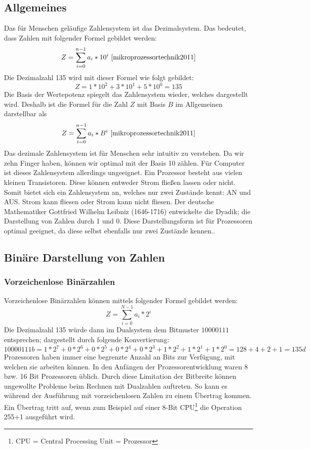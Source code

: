\documentclass[a4paper,12pt]{article}
\begin{document}
\subsection{Allgemeines}
Das für Menschen geläufige Zahlensystem ist das Dezimalsystem. Das bedeutet, dass Zahlen mit folgender Formel gebildet werden:
$$Z=\sum\limits_{i=0}^{n-1} a_i * 10^i \ \cite{mikroprozessortechnik2011}$$
Die Dezimalzahl 135 wird mit dieser Formel wie folgt gebildet:$$Z=1*10^2+3*10^1+5*10^0 = 135$$
Die Basis der Wertepotenz spiegelt das Zahlensystem wieder, welches dargestellt wird. Deshalb ist die Formel für die Zahl $Z$ mit Basis $B$ im Allgemeinen darstellbar als
$$Z=\sum\limits_{i=0}^{n-1} a_i * B^i \ \cite{mikroprozessortechnik2011}$$ 
Das dezimale Zahlensystem ist für Menschen sehr intuitiv zu verstehen. Da wir zehn Finger haben, können wir optimal mit der Basis 10 zählen. Für Computer ist dieses Zahlensystem allerdings ungeeignet. Ein Prozessor besteht aus vielen kleinen Transistoren. Diese können entweder Strom fließen lassen oder nicht. Somit bietet sich ein Zahlensystem an, welches nur zwei Zustände kennt: AN und AUS. Strom kann fliesen oder Strom kann nicht fliesen. Der deutsche Mathematiker Gottfried Wilhelm Leibniz (1646-1716) entwickelte die Dyadik; die Darstellung von Zahlen durch 1 und 0. Diese Darstellungsform ist für Prozessoren optimal geeignet, da diese selbst ebenfalls nur zwei Zustände kennen.\cite{mikroprozessortechnik2011}.

\subsection{Binäre Darstellung von Zahlen}

\subsubsection{Vorzeichenlose Binärzahlen}
Vorzeichenlose Binärzahlen können mittels folgender Formel gebildet werden: $$Z=\sum\limits_{i=0}^{N-1} a_i * 2^i$$ 
Die Dezimalzahl 135 würde dann im Dualsystem dem Bitmuster $10000111$ entsprechen; dargestellt durch folgende Konvertierung:
$$10000111b = 1*2^7+0*2^6+0*2^5+0*2^4+0*2^3+1*2^2+1*2^1+1*2^0 = 128 +4+2+1 = 135d$$
Prozessoren haben immer eine begrenzte Anzahl an Bits zur Verfügung, mit welchen sie arbeiten können. In den Anfängen der Prozessorentwicklung waren 8 bzw. 16 Bit Prozessoren üblich. Durch diese Limitation der Bitbreite können ungewollte Probleme beim Rechnen mit Dualzahlen auftreten. So kann es während der Ausführung mit vorzeichenlosen Zahlen zu einem Übertrag kommen. Ein Übertrag tritt auf, wenn zum Beispiel auf einer 8-Bit CPU\footnote{CPU =  Central Processing Unit = Prozessor} die Operation 255+1 ausgeführt wird.
\end{document}
